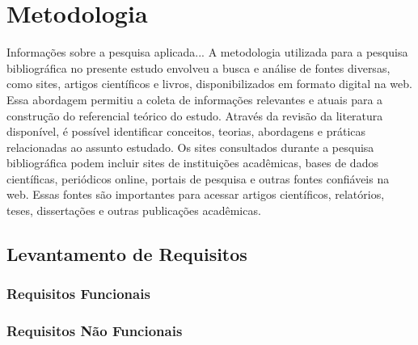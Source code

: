 \chapter{Metodologia}
Informações sobre a pesquisa aplicada...
A metodologia utilizada para a pesquisa bibliográfica no presente estudo envolveu a busca e análise de fontes diversas, como sites, artigos científicos e livros, disponibilizados em formato digital na web. Essa abordagem permitiu a coleta de informações relevantes e atuais para a construção do referencial teórico do estudo.
Através da revisão da literatura disponível, é possível identificar conceitos, teorias, abordagens e práticas relacionadas ao assunto estudado.
Os sites consultados durante a pesquisa bibliográfica podem incluir sites de instituições acadêmicas, bases de dados científicas, periódicos online, portais de pesquisa e outras fontes confiáveis na web. Essas fontes são importantes para acessar artigos científicos, relatórios, teses, dissertações e outras publicações acadêmicas.


\section{Levantamento de Requisitos}

\subsection{Requisitos Funcionais}

\subsection{Requisitos Não Funcionais}




